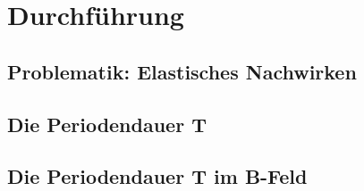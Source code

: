 \newpage
\section{Durchführung}
\label{sec:Durchfuehrung} %
\subsection{Problematik: Elastisches Nachwirken}
\subsection{Die Periodendauer T}
\subsection{Die Periodendauer T im B-Feld}


